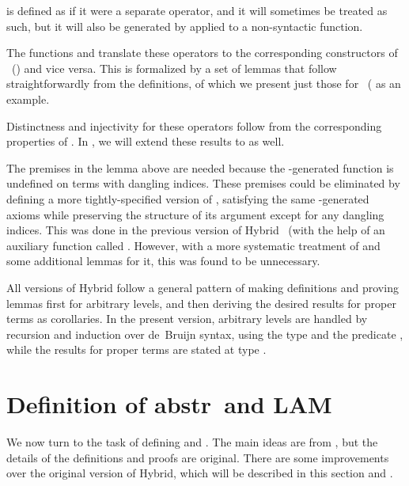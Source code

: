 \documentclass[copyright,creativecommons]{eptcs}
\begin{document}
 is defined as if it were a separate operator, and it will sometimes
be treated as such, but it will also be generated by  applied to a
non-syntactic function.

The functions  and  translate these operators to the
corresponding constructors of \ ()
and vice versa.  This is formalized by a set of lemmas that follow
straightforwardly from the definitions, of which we present just those
for \ ( as an example.

\begin{Lem}
\label{lem:hybrid-expr-dB-simps-ex} \formal
 \par\nopagebreak[3]

\end{Lem}

Distinctness and injectivity for these operators follow from the corresponding
properties of .  In , we will
extend these results to  as well.

The  premises in the lemma above are needed because the
-generated function  is undefined on terms with
dangling indices.  These premises could be eliminated by defining a
more tightly-specified version of , satisfying the same
-generated axioms while preserving the structure of its
argument except for any dangling indices.  This was done in the previous
version of Hybrid~\cite{momigliano/martin/felty:2008}
(with the help of an auxiliary function called .  However, with a
more systematic treatment of  and some additional lemmas for it,
this was found to be unnecessary.

All versions of Hybrid follow a general pattern of making definitions and
proving lemmas first for arbitrary levels, and then deriving the desired
results for proper terms as corollaries.  In the present version, arbitrary
levels are handled by recursion and induction over de~Bruijn syntax, using
the type  and the predicate , while the results for proper
terms are stated at type .


\section{Definition of \ldquo abstr\rdquo\ and \ldquo LAM\rdquo}
\label{sec:hybrid-defn-abstr-LAM}

We now turn to the task of defining  and .
The main ideas are from \cite{ambler/crole/momigliano:2002}, but the
details of the definitions and proofs are original.  There are some
improvements over the original version of Hybrid, which will be described
in this section and .
\end{document}
